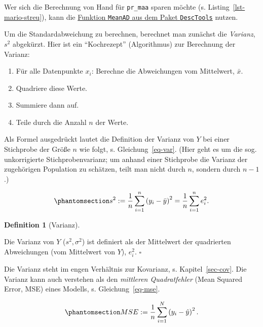 \documentclass[
  letterpaper,
  twoside,
  open=any]{scrbook}
\providecommand{\tightlist}{%
  \setlength{\itemsep}{0pt}\setlength{\parskip}{0pt}}\usepackage{longtable,booktabs,array}
\theoremstyle{definition}
\newtheorem{definition}{Definition}[chapter]
\theoremstyle{definition}
\theoremstyle{definition}
\theoremstyle{remark}
\begin{document}
Wer sich die Berechnung von Hand für \texttt{pr\_maa} sparen möchte (s.
Listing~\ref{lst-mario-streu}), kann die
\href{https://rdrr.io/cran/DescTools/man/MeanAD.html}{Funktion
\texttt{MeanAD} aus dem Paket \texttt{DescTools}} nutzen.

Um die Standardabweichung zu berechnen, berechnet man zunächst die
\emph{Varianz}, \(s^2\) abgekürzt. Hier ist ein \enquote{Kochrezept}
(Algorithmus) zur Berechnung der Varianz:

\begin{enumerate}
\def\labelenumi{\arabic{enumi}.}
\tightlist
\item
  Für alle Datenpunkte \(x_i\): Berechne die Abweichungen vom
  Mittelwert, \(\bar{x}\).
\item
  Quadriere diese Werte.
\item
  Summiere dann auf.
\item
  Teile durch die Anzahl \(n\) der Werte.
\end{enumerate}

Als Formel ausgedrückt lautet die Definition der Varianz von \(Y\) bei
einer Stichprobe der Größe \(n\) wie folgt, s. Gleichung~\ref{eq-var}.
(Hier geht es um die sog. unkorrigierte Stichprobenvarianz; um anhand
einer Stichprobe die Varianz der zugehörigen Population zu schätzen,
teilt man nicht durch \(n\), sondern durch \(n-1\).)

\begin{equation}\phantomsection\label{eq-var}{{\displaystyle s^{2}:={\frac {1}{n}}\sum _{i=1}^{n}\left(y_{i}-{\bar {y}}\right)^{2}={\frac {1}{n}}\sum _{i=1}^{n}e_i^{2}.}}\end{equation}

\begin{definition}[Varianz]\protect\hypertarget{def-var}{}\label{def-var}

Die Varianz von \(Y\) (\(s^2, \sigma^2\)) ist definiert als der
Mittelwert der quadrierten Abweichungen (vom Mittelwert von \(Y\)),
\(e_i^2\). \(\square\)

\end{definition}

Die Varianz steht im engen Verhältnis zur Kovarianz, s.
Kapitel~\ref{sec-cov}. Die Varianz kann auch verstehen als den
\emph{mittleren Quadratfehler} (Mean Squared Error, MSE) eines Modells,
s. Gleichung~\ref{eq-mse}.

\begin{equation}\phantomsection\label{eq-mse}{{\displaystyle MSE:={\frac {1}{n}}\sum _{i=1}^{N}\left(y_{i}-{\hat {y}}\right)^{2}.}}\end{equation}
\end{document}
